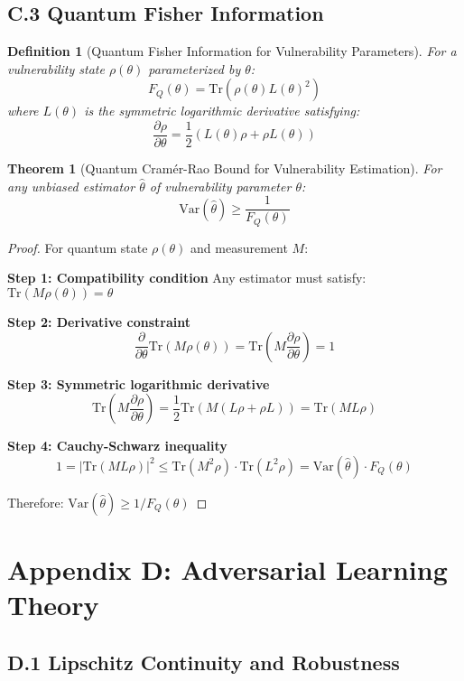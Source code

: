 \documentclass[journal]{IEEEtran}
\newtheorem{theorem}{Theorem}
\newtheorem{definition}{Definition}
\begin{document}
\subsection{C.3 Quantum Fisher Information}

\begin{definition}[Quantum Fisher Information for Vulnerability Parameters]
For a vulnerability state $\rho(\theta)$ parameterized by $\theta$:
$$F_Q(\theta) = \text{Tr}(\rho(\theta) L(\theta)^2)$$
where $L(\theta)$ is the symmetric logarithmic derivative satisfying:
$$\frac{\partial \rho}{\partial \theta} = \frac{1}{2}(L(\theta)\rho + \rho L(\theta))$$
\end{definition}

\begin{theorem}[Quantum Cramér-Rao Bound for Vulnerability Estimation]
For any unbiased estimator $\hat{\theta}$ of vulnerability parameter $\theta$:
$$\text{Var}(\hat{\theta}) \geq \frac{1}{F_Q(\theta)}$$
\end{theorem}

\begin{proof}
For quantum state $\rho(\theta)$ and measurement $M$:

\textbf{Step 1: Compatibility condition}
Any estimator must satisfy: $\text{Tr}(M \rho(\theta)) = \theta$

\textbf{Step 2: Derivative constraint}
$$\frac{\partial}{\partial \theta} \text{Tr}(M \rho(\theta)) = \text{Tr}(M \frac{\partial \rho}{\partial \theta}) = 1$$

\textbf{Step 3: Symmetric logarithmic derivative}
$$\text{Tr}(M \frac{\partial \rho}{\partial \theta}) = \frac{1}{2}\text{Tr}(M(L\rho + \rho L)) = \text{Tr}(ML\rho)$$

\textbf{Step 4: Cauchy-Schwarz inequality}
$$1 = |\text{Tr}(ML\rho)|^2 \leq \text{Tr}(M^2\rho) \cdot \text{Tr}(L^2\rho) = \text{Var}(\hat{\theta}) \cdot F_Q(\theta)$$

Therefore: $\text{Var}(\hat{\theta}) \geq 1/F_Q(\theta)$
\end{proof}

\section{Appendix D: Adversarial Learning Theory}

\subsection{D.1 Lipschitz Continuity and Robustness}
\end{document}
